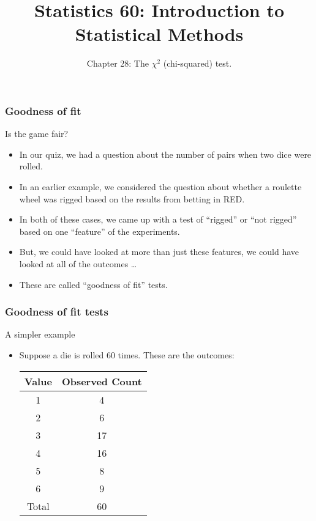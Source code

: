 \documentclass[handout]{beamer}
\title{Statistics 60: Introduction to Statistical Methods}
\subtitle{Chapter 28: The $\chi^2$ (chi-squared) test.}
\author{}%
\begin{document}
   \begin{frame}
   \titlepage
   \end{frame}


   \begin{frame} \frametitle{Goodness of fit}

   \begin{block}
   {Is the game fair?}
   \begin{itemize}
   \item In our quiz, we had a question about the number of pairs
   when two dice were rolled.

   \item In an earlier example, we considered the question about
   whether a roulette wheel was rigged based on the results
   from betting in {\color{red} RED}.

   \item In both of these cases, we came up with a test of ``rigged'' or
   ``not rigged'' based on one ``feature'' of the experiments.

   \item But, we could have looked at more than just these features, we could
   have looked at all of the outcomes \dots
   \item These are called ``goodness of fit'' tests.

   \end{itemize}
   \end{block}
   \end{frame}


   \begin{frame} \frametitle{Goodness of fit tests}

   \begin{block}
   {A simpler example}
   \begin{itemize}
   \item Suppose a die is rolled 60 times. These are the outcomes:

     \begin{center}
     \begin{tabular}{c|c}
       Value & Observed Count \\ \hline
       1 & 4   \\
       2 & 6 \\
       3 & 17 \\
       4 & 16 \\
       5 & 8 \\
       6 & 9 \\  \hline
       Total & 60 \\
     \end{tabular}
     \end{center}

   \end{itemize}
   \end{block}
   \end{frame}
\end{document}
